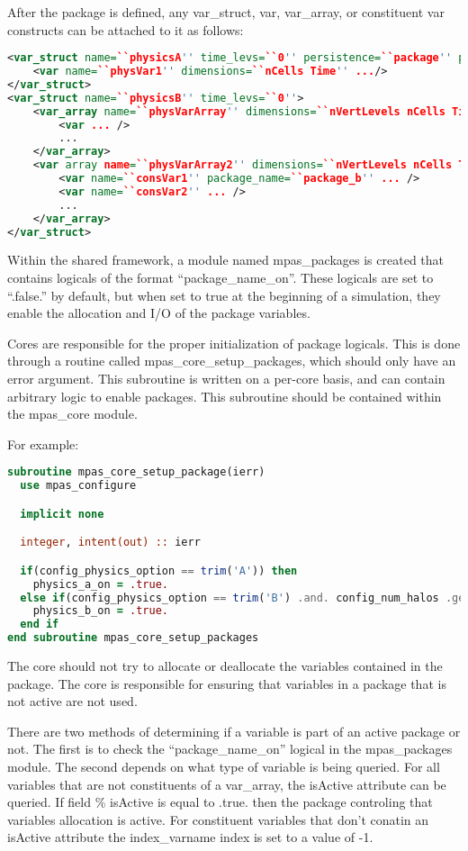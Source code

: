 \documentclass[11pt]{report}
\begin{document}
After the package is defined, any var\_struct, var, var\_array, or constituent
var constructs can be attached to it as follows:

{\scriptsize
\begin{lstlisting}[language=XML]
<var_struct name=``physicsA'' time_levs=``0'' persistence=``package'' package_name=``package_a''>
	<var name=``physVar1'' dimensions=``nCells Time'' .../>
</var_struct>
<var_struct name=``physicsB'' time_levs=``0''>
	<var_array name=``physVarArray'' dimensions=``nVertLevels nCells Time'' persistence=``package'' package_name=``package_b''>
		<var ... />
		...
	</var_array>
	<var array name=``physVarArray2'' dimensions=``nVertLevels nCells Time''>
		<var name=``consVar1'' package_name=``package_b'' ... />
		<var name=``consVar2'' ... />
		...
	</var_array>
</var_struct>
\end{lstlisting}
}

Within the shared framework, a module named mpas\_packages is created that
contains logicals of the format ``package\_name\_on''. These logicals are set
to ``.false.'' by default, but when set to true at the beginning of a
simulation, they enable the allocation and I/O of the package variables. 

Cores are responsible for the proper initialization of package logicals. This
is done through a routine called mpas\_core\_setup\_packages, which should only have
an error argument. This subroutine is written on a per-core basis, and can
contain arbitrary logic to enable packages. This subroutine should be contained
within the mpas\_core module.

For example:
{\scriptsize
\begin{lstlisting}[language=Fortran]
subroutine mpas_core_setup_package(ierr)
  use mpas_configure

  implicit none

  integer, intent(out) :: ierr

  if(config_physics_option == trim('A')) then
    physics_a_on = .true.
  else if(config_physics_option == trim('B') .and. config_num_halos .ge. 3) then
    physics_b_on = .true.
  end if
end subroutine mpas_core_setup_packages
\end{lstlisting}
}

The core should not try to allocate or deallocate the variables contained in
the package. The core is responsible for ensuring that variables in a package
that is not active are not used.

There are two methods of determining if a variable is part of an active package
or not. The first is to check the ``package\_name\_on'' logical in the
mpas\_packages module. The second depends on what type of variable is being
queried. For all variables that are not constituents of a var\_array, the
isActive attribute can be queried. If field \% isActive is equal to .true. then
the package controling that variables allocation is active. For constituent
variables that don't conatin an isActive attribute the index\_varname index is
set to a value of -1. 
\end{document}
